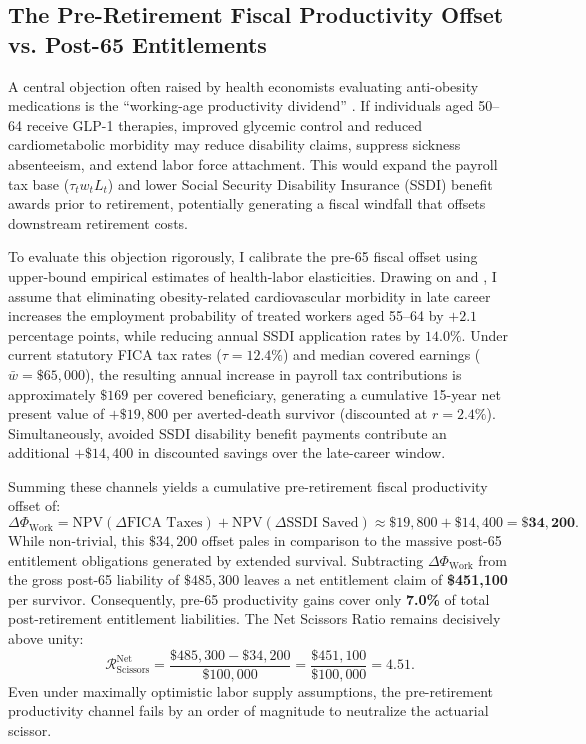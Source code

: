 \documentclass[11pt,a4paper]{article}
\begin{document}
\subsection{The Pre-Retirement Fiscal Productivity Offset vs. Post-65 Entitlements}
A central objection often raised by health economists evaluating anti-obesity medications is the ``working-age productivity dividend'' \citep{autor2014disability,french2014effect}. If individuals aged 50--64 receive GLP-1 therapies, improved glycemic control and reduced cardiometabolic morbidity may reduce disability claims, suppress sickness absenteeism, and extend labor force attachment. This would expand the payroll tax base ($\tau_t w_t L_t$) and lower Social Security Disability Insurance (SSDI) benefit awards prior to retirement, potentially generating a fiscal windfall that offsets downstream retirement costs.

To evaluate this objection rigorously, I calibrate the pre-65 fiscal offset using upper-bound empirical estimates of health-labor elasticities. Drawing on \citet{french2014effect} and \citet{autor2014disability}, I assume that eliminating obesity-related cardiovascular morbidity in late career increases the employment probability of treated workers aged 55--64 by $+2.1$ percentage points, while reducing annual SSDI application rates by $14.0\%$. Under current statutory FICA tax rates ($\tau = 12.4\%$) and median covered earnings ($\bar{w} = \$65,000$), the resulting annual increase in payroll tax contributions is approximately $\$169$ per covered beneficiary, generating a cumulative 15-year net present value of $+\$19,800$ per averted-death survivor (discounted at $r = 2.4\%$). Simultaneously, avoided SSDI disability benefit payments contribute an additional $+\$14,400$ in discounted savings over the late-career window.

Summing these channels yields a cumulative pre-retirement fiscal productivity offset of:
\begin{equation}
    \Delta \Phi_{\text{Work}} = \text{NPV}(\Delta \text{FICA Taxes}) + \text{NPV}(\Delta \text{SSDI Saved}) \approx \$19,800 + \$14,400 = \mathbf{\$34,200}.
\end{equation}
While non-trivial, this $\$34,200$ offset pales in comparison to the massive post-65 entitlement obligations generated by extended survival. Subtracting $\Delta \Phi_{\text{Work}}$ from the gross post-65 liability of $\$485,300$ leaves a net entitlement claim of \textbf{\$451,100} per survivor. Consequently, pre-65 productivity gains cover only \textbf{7.0\%} of total post-retirement entitlement liabilities. The Net Scissors Ratio remains decisively above unity:
\begin{equation}
    \mathcal{R}_{\text{Scissors}}^{\text{Net}} = \frac{\$485,300 - \$34,200}{\$100,000} = \frac{\$451,100}{\$100,000} = \mathbf{4.51}.
\end{equation}
Even under maximally optimistic labor supply assumptions, the pre-retirement productivity channel fails by an order of magnitude to neutralize the actuarial scissor.
\end{document}
